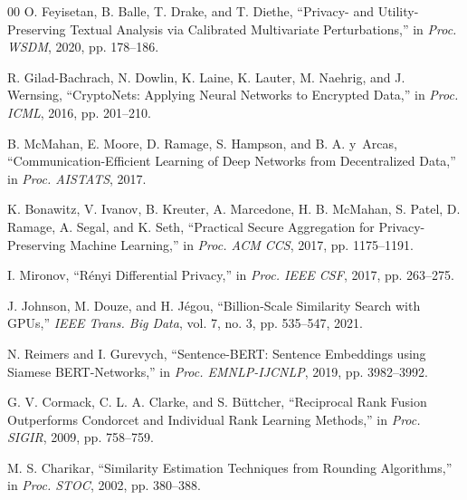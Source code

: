 \documentclass[conference]{IEEEtran}
\begin{document}
\begin{thebibliography}{00}
O. Feyisetan, B. Balle, T. Drake, and T. Diethe, ``Privacy- and Utility-Preserving Textual Analysis via Calibrated Multivariate Perturbations,'' in \textit{Proc. WSDM}, 2020, pp. 178--186.

R. Gilad-Bachrach, N. Dowlin, K. Laine, K. Lauter, M. Naehrig, and J. Wernsing, ``CryptoNets: Applying Neural Networks to Encrypted Data,'' in \textit{Proc. ICML}, 2016, pp. 201--210.

B. McMahan, E. Moore, D. Ramage, S. Hampson, and B. A. y~Arcas, ``Communication-Efficient Learning of Deep Networks from Decentralized Data,'' in \textit{Proc. AISTATS}, 2017.

K. Bonawitz, V. Ivanov, B. Kreuter, A. Marcedone, H. B. McMahan, S. Patel, D. Ramage, A. Segal, and K. Seth, ``Practical Secure Aggregation for Privacy-Preserving Machine Learning,'' in \textit{Proc. ACM CCS}, 2017, pp. 1175--1191.

I. Mironov, ``R\'{e}nyi Differential Privacy,'' in \textit{Proc. IEEE CSF}, 2017, pp. 263--275.

J. Johnson, M. Douze, and H. J\'{e}gou, ``Billion-Scale Similarity Search with GPUs,'' \textit{IEEE Trans. Big Data}, vol. 7, no. 3, pp. 535--547, 2021.

N. Reimers and I. Gurevych, ``Sentence-BERT: Sentence Embeddings using Siamese BERT-Networks,'' in \textit{Proc. EMNLP-IJCNLP}, 2019, pp. 3982--3992.

G. V. Cormack, C. L. A. Clarke, and S. B\"{u}ttcher, ``Reciprocal Rank Fusion Outperforms Condorcet and Individual Rank Learning Methods,'' in \textit{Proc. SIGIR}, 2009, pp. 758--759.

M. S. Charikar, ``Similarity Estimation Techniques from Rounding Algorithms,'' in \textit{Proc. STOC}, 2002, pp. 380--388.

\end{thebibliography}
\end{document}
